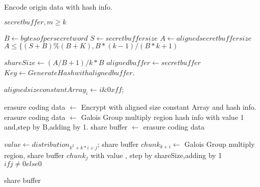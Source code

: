 \documentclass{article}
\begin{document}
\begin{algorithm}[htb]
  \caption{Encode origin data with hash info.}
    \begin{algorithmic}[1]
	\REQUIRE $secret buffer,m \ge k$

	\STATE $B \gets bytesof per secret word$
	\STATE $S \gets secret buffer size$
	\STATE $A \gets aligned secret buffer size$
	\ENSURE $A \le \{(S+B) \% (B+K), B*(k-1) / (B*k+1)$ 

	\STATE $shareSize \gets (A / B + 1) / k * B$
	\STATE $aligned buffer \gets secret buffer$
	\STATE $Key \gets Generate Hash with aligned buffer$.

        \STATE $aligned size constant Array_i \gets i\&0xff$;
	\ENDFOR

	\STATE erasure coding data $\gets$ Encrypt with aligned size constant Array and hash info.
	\STATE erasure coding data $\gets$ Galois Group multiply region hash info with value 1 and,step by B,adding by 1.
	\STATE share buffer $\gets$ erasure coding data

            \STATE $value \gets distribution_{k^2+k*i+j}$;
            \STATE
            share buffer $chunk_{k+i} \gets$ Galois Group multiply region,
            share buffer $chunk_j$ with value ,
            step by shareSize,adding by 1 $if j \neq 0 else 0$
        \ENDFOR
    \ENDFOR

	\RETURN share buffer

\end{algorithmic}
\end{algorithm}
\end{document}
